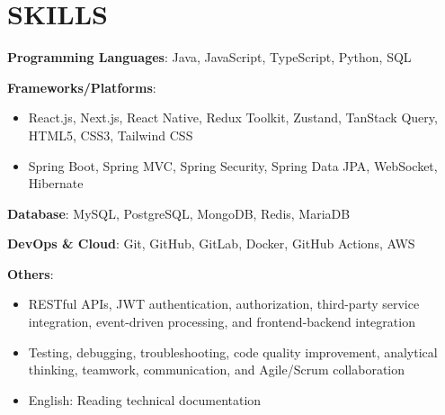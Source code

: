 \section{SKILLS}
\resumeSubHeadingListStart

  \item
    \resumeItemListStart
      \item \textbf{Programming Languages}: Java, JavaScript, TypeScript, Python, SQL
      \item \textbf{Frameworks/Platforms}:
        \begin{itemize}
          \item React.js, Next.js, React Native, Redux Toolkit, Zustand, TanStack Query, HTML5, CSS3, Tailwind CSS
          \item Spring Boot, Spring MVC, Spring Security, Spring Data JPA, WebSocket, Hibernate
        \end{itemize}
      \item \textbf{Database}: MySQL, PostgreSQL, MongoDB, Redis, MariaDB
      \item \textbf{DevOps \& Cloud}: Git, GitHub, GitLab, Docker, GitHub Actions, AWS
      \item \textbf{Others}:
        \begin{itemize}
          \item RESTful APIs, JWT authentication, authorization, third-party service integration, event-driven processing, and frontend-backend integration
          \item Testing, debugging, troubleshooting, code quality improvement, analytical thinking, teamwork, communication, and Agile/Scrum collaboration
          \item English: Reading technical documentation
        \end{itemize}
    \resumeItemListEnd

\resumeSubHeadingListEnd
